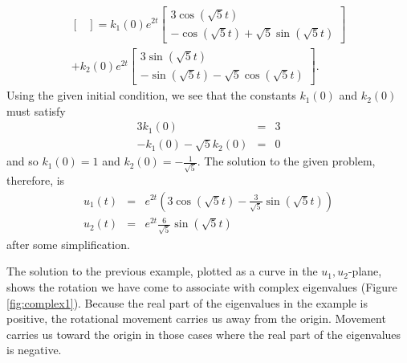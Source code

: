 \documentclass[../book.tex]{subfiles}
\begin{document}
\begin{solution}
\begin{multline}
\begin{bmatrix}
  \end{bmatrix}
  =
  k_1(0) 
  e^{2t}  
  \begin{bmatrix}
    3  \cos (\sqrt{5}t)
    \\
    - \cos(\sqrt{5}t) + \sqrt{5}\sin(\sqrt{5}t)
  \end{bmatrix}
  \\[1ex]+
  k_2(0) 
  e^{2t} 
  \begin{bmatrix}
    3  \sin(\sqrt{5}t) \\
    -\sin(\sqrt{5}t) - \sqrt{5}  \cos(\sqrt{5}t)
  \end{bmatrix}.
\end{multline}
Using the given initial condition, we see that the constants \(k_1(0)\) and \(k_2(0)\) must satisfy
\begin{equation}\label{eq:sys-29}
\begin{array}{rcl}
  3  k_1(0) &=& 3 \\
  -k_1(0) - \sqrt{5} k_2(0) &=& 0
\end{array}
\end{equation}
and so \(k_1(0) = 1\) and \(k_2(0) = -\frac{1}{\sqrt{5}}\). The solution to the given problem, therefore, is
\begin{equation}\label{eq:sys-30}
\begin{array}{lcl}
  u_1(t)
                          &=&
                          e^{2 t} \left(3 \cos(\sqrt{5} t) - \frac{3}{\sqrt{5}} \sin (\sqrt{5} t)\right) \\
  u_2(t) &=&
  e^{2 t} 
  \frac{6}{\sqrt{5}}\sin(\sqrt{5}t)
\end{array}
\end{equation}
after some simplification.
\end{solution}

The solution to the previous example, plotted as a curve in the \(u_1,u_2\)-plane, shows the rotation we have come to associate with complex eigenvalues (Figure \ref{fig:complex1}). Because the real part of the eigenvalues in the example is positive, the rotational movement carries us away from the origin. Movement carries us toward the origin in those cases where the real part of the eigenvalues is negative.
\end{document}
